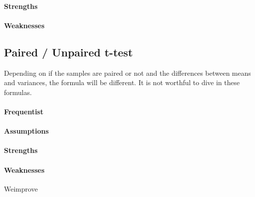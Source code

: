 \paragraph{Strengths}
\paragraph{Weaknesses}

\subsection{Paired / Unpaired  t-test}
Depending on if the samples are paired or not and the differences between means and variances, the formula will be different. 
It is not worthful to dive in these formulas.
\paragraph{Frequentist}
\paragraph{Assumptions}
\paragraph{Strengths}
\paragraph{Weaknesses}

Weimprove
